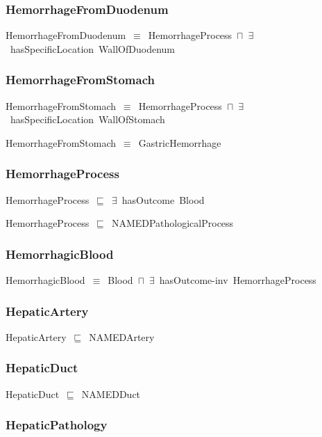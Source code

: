 \documentclass{article}
\begin{document}
\subsubsection*{HemorrhageFromDuodenum}

HemorrhageFromDuodenum~\ensuremath{\equiv}~HemorrhageProcess~\ensuremath{\sqcap}~\ensuremath{\exists}~hasSpecificLocation~WallOfDuodenum

\subsubsection*{HemorrhageFromStomach}

HemorrhageFromStomach~\ensuremath{\equiv}~HemorrhageProcess~\ensuremath{\sqcap}~\ensuremath{\exists}~hasSpecificLocation~WallOfStomach

HemorrhageFromStomach~\ensuremath{\equiv}~GastricHemorrhage

\subsubsection*{HemorrhageProcess}

HemorrhageProcess~\ensuremath{\sqsubseteq}~\ensuremath{\exists}~hasOutcome~Blood~

HemorrhageProcess~\ensuremath{\sqsubseteq}~NAMEDPathologicalProcess~

\subsubsection*{HemorrhagicBlood}

HemorrhagicBlood~\ensuremath{\equiv}~Blood~\ensuremath{\sqcap}~\ensuremath{\exists}~hasOutcome-inv~HemorrhageProcess

\subsubsection*{HepaticArtery}

HepaticArtery~\ensuremath{\sqsubseteq}~NAMEDArtery~

\subsubsection*{HepaticDuct}

HepaticDuct~\ensuremath{\sqsubseteq}~NAMEDDuct~

\subsubsection*{HepaticPathology}
\end{document}
